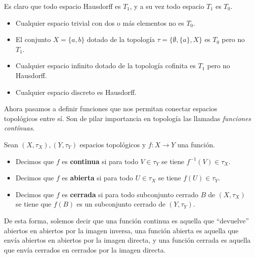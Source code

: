 Es claro que todo espacio Hausdorff es $T_1$, y a su vez todo espacio $T_1$ es $T_0$.
\begin{Ejm}
   \phantom{o}
   \begin{itemize}
      \item Cualquier espacio trivial con dos o más elementos no es $T_0$.
      \item El conjunto $X=\{a,b\}$ dotado de la topología $\tau=\{\emptyset,\{a\},X\}$ es $T_0$ pero no $T_1$.
      \item Cualquier espacio infinito dotado de la topología cofinita es $T_1$ pero no Hausdorff.
      \item Cualquier espacio discreto es Hausdorff.
   \end{itemize}
\end{Ejm}
Ahora pasamos a definir funciones que nos permitan conectar espacios topológicos entre sí. Son de pilar importancia en topología las llamadas \textit{funciones contínuas}.
\begin{Def}
   Sean $(X,\tau_X), (Y,\tau_Y)$ espacios topológicos y $f:X\to Y$ una función.
   \begin{itemize}
      \item[1.] Decimos que $f$ es \textbf{continua} si para todo $V\in\tau_Y$ se tiene $f^{-1}(V)\in \tau_X$.
      \item[2.] Decimos que $f$ es \textbf{abierta} si para todo $U\in \tau_X$ se tiene $f(U)\in \tau_Y$.
      \item[3.] Decimos que $f$ es \textbf{cerrada} si para todo subconjunto cerrado $B$ de $(X,\tau_X)$ se tiene que $f(B)$ es un subconjunto cerrado de $(Y,\tau_Y)$.
   \end{itemize}
\end{Def}
De esta forma, solemos decir que una función continua es aquella que ``devuelve'' abiertos en abiertos por la imagen inversa, una función abierta es aquella que envía abiertos en abiertos por la imagen directa, y una función cerrada es aquella que envía cerrados en cerrados por la imagen directa.
